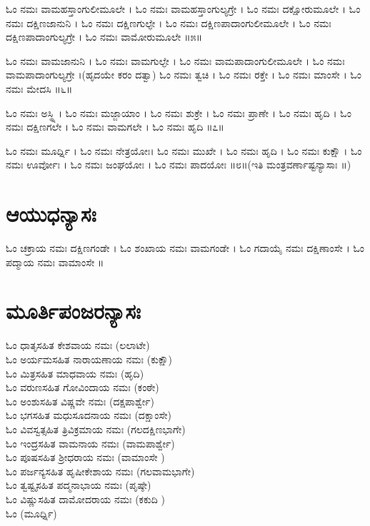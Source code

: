 ಓಂ  ನಮಃ ವಾಮಹಸ್ತಾಂಗುಲೀಮೂಲೇ । ಓಂ  ನಮಃ ವಾಮಹಸ್ತಾಂಗುಲ್ಯಗ್ರೇ । ಓಂ  ನಮಃ ದಕ್ಷೋರುಮೂಲೇ । ಓಂ  ನಮಃ ದಕ್ಷಿಣಜಾನುನಿ । ಓಂ  ನಮಃ ದಕ್ಷಿಣಗುಲ್ಫೇ । ಓಂ  ನಮಃ ದಕ್ಷಿಣಪಾದಾಂಗುಲೀಮೂಲೇ । ಓಂ  ನಮಃ ದಕ್ಷಿಣಪಾದಾಂಗುಲ್ಯಗ್ರೇ । ಓಂ  ನಮಃ ವಾಮೋರುಮೂಲೇ ॥೫॥

ಓಂ  ನಮಃ ವಾಮಜಾನುನಿ । ಓಂ  ನಮಃ ವಾಮಗುಲ್ಫೇ । ಓಂ  ನಮಃ ವಾಮಪಾದಾಂಗುಲೀಮೂಲೇ । ಓಂ  ನಮಃ ವಾಮಪಾದಾಂಗುಲ್ಯಗ್ರೇ ।(ಹೃದಯೇ ಕರಂ ದತ್ವಾ) ಓಂ  ನಮಃ ತ್ವಚಿ । ಓಂ  ನಮಃ ರಕ್ತೇ । ಓಂ  ನಮಃ ಮಾಂಸೇ । ಓಂ  ನಮಃ ಮೇದಸಿ ॥೬॥

ಓಂ  ನಮಃ ಅಸ್ಥ್ನಿ । ಓಂ  ನಮಃ ಮಜ್ಜಾಯಾಂ । ಓಂ  ನಮಃ ಶುಕ್ರೇ । ಓಂ  ನಮಃ ಪ್ರಾಣೇ । ಓಂ  ನಮಃ ಹೃದಿ । ಓಂ  ನಮಃ ದಕ್ಷಿಣಗಲೇ । ಓಂ  ನಮಃ ವಾಮಗಲೇ । ಓಂ  ನಮಃ ಹೃದಿ ॥೭॥

ಓಂ  ನಮಃ ಮೂರ್ಧ್ನಿ । ಓಂ  ನಮಃ ನೇತ್ರಯೋಃ। ಓಂ  ನಮಃ ಮುಖೇ । ಓಂ  ನಮಃ ಹೃದಿ । ಓಂ  ನಮಃ ಕುಕ್ಷೌ । ಓಂ  ನಮಃ ಊರ್ವೋಃ । ಓಂ  ನಮಃ ಜಂಘಯೋಃ । ಓಂ  ನಮಃ ಪಾದಯೋಃ ॥೮॥(ಇತಿ ಮಂತ್ರವರ್ಣಾಷ್ಟನ್ಯಾಸಾಃ ॥)
 \section{ಆಯುಧನ್ಯಾಸಃ}
ಓಂ ಚಕ್ರಾಯ ನಮಃ ದಕ್ಷಿಣಗಂಡೇ । ಓಂ ಶಂಖಾಯ ನಮಃ ವಾಮಗಂಡೇ । ಓಂ ಗದಾಯೈ ನಮಃ ದಕ್ಷಿಣಾಂಸೇ । ಓಂ ಪದ್ಮಾಯ ನಮಃ ವಾಮಾಂಸೇ ॥
 \section{ಮೂರ್ತಿಪಂಜರನ್ಯಾಸಃ}
ಓಂ  ಧಾತೃಸಹಿತ ಕೇಶವಾಯ ನಮಃ (ಲಲಾಟೇ)\\
ಓಂ  ಅರ್ಯಮಸಹಿತ ನಾರಾಯಣಾಯ ನಮಃ (ಕುಕ್ಷೌ)\\
ಓಂ  ಮಿತ್ರಸಹಿತ ಮಾಧವಾಯ ನಮಃ (ಹೃದಿ)\\
ಓಂ  ವರುಣಸಹಿತ ಗೋವಿಂದಾಯ ನಮಃ (ಕಂಠೇ)\\
ಓಂ  ಅಂಶುಸಹಿತ ವಿಷ್ಣವೇ ನಮಃ (ದಕ್ಷಪಾರ್ಶ್ವೇ)\\
ಓಂ  ಭಗಸಹಿತ ಮಧುಸೂದನಾಯ ನಮಃ (ದಕ್ಷಾಂಸೇ)\\
ಓಂ  ವಿವಸ್ವತ್ಸಹಿತ ತ್ರಿವಿಕ್ರಮಾಯ ನಮಃ (ಗಲದಕ್ಷಿಣಭಾಗೇ)\\
ಓಂ  ಇಂದ್ರಸಹಿತ  ವಾಮನಾಯ ನಮಃ (ವಾಮಪಾರ್ಶ್ವೇ)\\
ಓಂ  ಪೂಷಸಹಿತ ಶ್ರೀಧರಾಯ ನಮಃ (ವಾಮಾಂಸೇ )\\
ಓಂ  ಪರ್ಜನ್ಯಸಹಿತ  ಹೃಷೀಕೇಶಾಯ ನಮಃ (ಗಲವಾಮಭಾಗೇ)\\
ಓಂ  ತ್ವಷ್ಟೃಸಹಿತ ಪದ್ಮನಾಭಾಯ ನಮಃ (ಪೃಷ್ಠೇ)\\
ಓಂ  ವಿಷ್ಣುಸಹಿತ  ದಾಮೋದರಾಯ ನಮಃ (ಕಕುದಿ )\\
ಓಂ  (ಮೂರ್ಧ್ನಿ)
